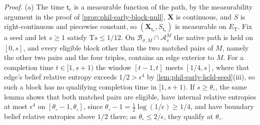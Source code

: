 \noindent\emph{Proof.}
(a) The time \(\mathsf t_{\mathrm c}\) is a measurable function of the path,
by the measurability argument in the proof of
\cref{prop:phil-early-block-null}, \(\mathbf X\) is continuous, and \(S\) is
right-continuous and piecewise constant, so
\((\mathbf X_{\mathsf t_{\mathrm c}},S_{\mathsf t_{\mathrm c}})\) is measurable
on \(E_{\mathrm T}\). Fix a seed and let \(s\ge1\) satisfy
\(\mathrm Ts\le1/12\). On \(\mathscr B_{\sigma,M}\cap\mathscr A^M_s\) the
native path is held on \([0,s]\), and every eligible block other than the two
matched pairs of \(M\), namely the other two pairs and the four triples,
contains an edge exterior to \(M\). For a completion time \(t\in[1,s+1)\) the
window \([t-1,t]\) meets \([1/4,s]\), where that edge's belief relative
entropy exceeds \(1/2>\epsilon^4\) by \cref{lem:phil-early-held-seed}(iii), so
such a block has no qualifying completion time in \([1,s+1)\). If
\(s\ge\theta_\circ\), the same lemma shows that both matched pairs are
eligible, have internal relative entropies at most \(\epsilon^4\) on
\([\theta_\circ-1,\theta_\circ]\), since
\(\theta_\circ-1=\frac12\log(1/\epsilon)\ge1/4\), and have boundary belief
relative entropies above \(1/2\) there; as \(\theta_\circ\le2/\epsilon\), they
qualify at \(\theta_\circ\).


